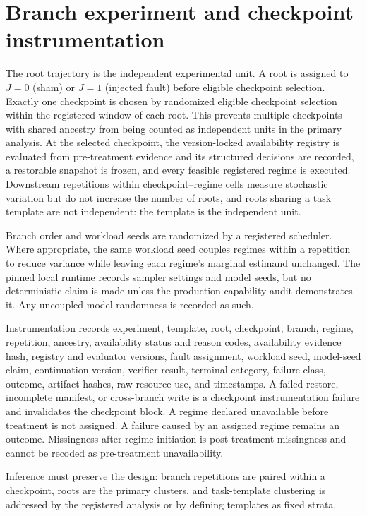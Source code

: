 \section{Branch experiment and checkpoint instrumentation}
\label{sec:branch}

The root trajectory is the independent experimental unit.  A root is assigned
to $J=0$ (sham) or $J=1$ (injected fault) before eligible checkpoint selection.
Exactly one checkpoint is chosen by randomized eligible checkpoint selection
within the registered window of each root.  This prevents multiple checkpoints
with shared ancestry from being counted as independent units in the primary
analysis.  At the selected checkpoint, the version-locked availability registry
is evaluated from pre-treatment evidence and its structured decisions are
recorded, a restorable snapshot is frozen, and every feasible registered regime
is executed.  Downstream
repetitions within checkpoint--regime cells measure stochastic variation but
do not increase the number of roots, and roots sharing a task template are not
independent: the template is the independent unit.

Branch order and workload seeds are randomized by a registered scheduler.
Where appropriate, the same workload seed couples regimes within a repetition
to reduce variance while leaving each regime's marginal estimand unchanged.
The pinned local runtime records sampler settings and model seeds, but no
deterministic claim is made unless the production capability audit demonstrates
it.  Any uncoupled model randomness is recorded as such.

Instrumentation records experiment, template, root, checkpoint, branch,
regime, repetition, ancestry, availability status and reason codes, availability
evidence hash, registry and evaluator versions, fault assignment, workload seed,
model-seed claim, continuation version, verifier result, terminal category,
failure class, outcome, artifact hashes, raw resource use, and timestamps.
A failed restore, incomplete manifest, or cross-branch write is a checkpoint
instrumentation failure and invalidates the checkpoint block.  A regime
declared unavailable before treatment is not assigned.  A failure caused by an
assigned regime remains an outcome.  Missingness after regime initiation is
post-treatment missingness and cannot be recoded as pre-treatment
unavailability.

Inference must preserve the design: branch repetitions are paired within a
checkpoint, roots are the primary clusters, and task-template clustering is
addressed by the registered analysis or by defining templates as fixed strata.

